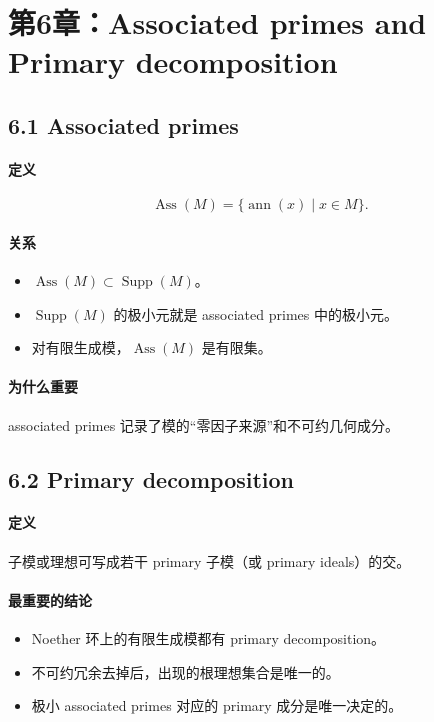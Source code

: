 \documentclass[a4paper]{ctexart}
\begin{document}
\section{第6章：Associated primes and Primary decomposition}

\subsection{6.1 Associated primes}

\paragraph{定义}
\[
\operatorname{Ass}(M)=\{\operatorname{ann}(x)\mid x\in M\}.
\]

\paragraph{关系}
\begin{itemize}
  \item \(\operatorname{Ass}(M)\subset \operatorname{Supp}(M)\)。
  \item \(\operatorname{Supp}(M)\) 的极小元就是 associated primes 中的极小元。
  \item 对有限生成模，\(\operatorname{Ass}(M)\) 是有限集。
\end{itemize}

\paragraph{为什么重要}
associated primes 记录了模的“零因子来源”和不可约几何成分。

\subsection{6.2 Primary decomposition}

\paragraph{定义}
子模或理想可写成若干 primary 子模（或 primary ideals）的交。

\paragraph{最重要的结论}
\begin{itemize}
  \item Noether 环上的有限生成模都有 primary decomposition。
  \item 不可约冗余去掉后，出现的根理想集合是唯一的。
  \item 极小 associated primes 对应的 primary 成分是唯一决定的。
\end{itemize}
\end{document}
